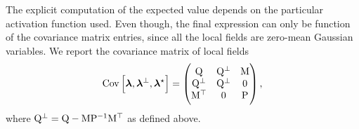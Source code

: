 The explicit computation of the expected value depends on the particular activation function used. Even though, the final expression can only be function of the covariance matrix entries, since all the local fields are zero-mean Gaussian variables.
We report the covariance matrix of local fields
\begin{equation} \label{2302:eq:def:new_covariance}
\operatorname{Cov}\left[{\boldsymbol{\lambda}}, {\boldsymbol{\lambda}}^\bot, {\boldsymbol{\lambda}}^\star\right] = 
\begin{pmatrix}
\mathrm{Q} & \mathrm{Q}^\bot & \mathrm{M} \\
\mathrm{Q}^\bot & \mathrm{Q}^\bot & 0 \\
{\mathrm{M}^{\top}} & 0 & \mathrm{P}
\end{pmatrix},
\end{equation}
where $\mathrm{Q}^\bot = \mathrm{Q} - \mathrm{M}\mathrm{P}^{-1}\mathrm{M}^\top$ as defined above.
